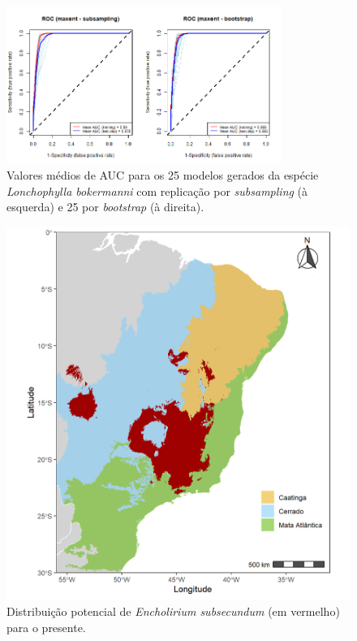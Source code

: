 \documentclass[
  11pt,
]{article}
\begin{document}
\begin{figure}
\centering
\includegraphics[width=0.8\textwidth,height=\textheight]{AUC_bokermanni.png}
\caption{Valores médios de AUC para os 25 modelos gerados da espécie
\emph{Lonchophylla bokermanni} com replicação por \emph{subsampling} (à
esquerda) e 25 por \emph{bootstrap} (à direita).}
\end{figure}

\begin{figure}
\centering
\includegraphics[width=1\textwidth,height=\textheight]{../Graficos/E_subsecundum_mapas_feitos/presente_e_biomas.jpeg}
\caption{Distribuição potencial de \emph{Encholirium subsecundum} (em
vermelho) para o presente.}
\end{figure}
\end{document}
